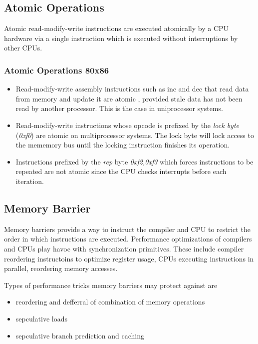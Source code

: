 \documentclass{article}
\begin{document}
\subsection{Atomic Operations}

Atomic read-modify-write instructions are executed atomically by a CPU
hardware via a single instruction which is executed without
interruptions by other CPUs.

\subsubsection{Atomic Operations 80x86}

\begin{itemize}
  \item Read-modify-write assembly instructions such as inc and dec
    that read data from memory and update it are atomic , provided
    stale data has not been read by another processor. This is the
    case in uniprocessor systems.

  \item Read-modify-write instructions whose opcode is prefixed by the
    \emph{lock byte} (\emph{0xf0}) are atomic on multiprocessor
    systems.  The lock byte will lock access to the mememory bus until
    the locking instruction finishes its operation.
  \item Instructions prefixed by the \emph{rep} byte \emph{0xf2,0xf3}
    which forces instructions to be repeated are not atomic since the
    CPU checks interrupts before each iteration.

\end{itemize}


\subsection{Memory Barrier}


Memory barriers provide a way to instruct the compiler and CPU to
restrict the order in which instructions are executed. Performance
optimizations of compilers and CPUs play havoc with synchronization
primitives. These include compiler reordering instructoins to optimize
register usage, CPUs executing instructions in parallel, reordering
memory accesses.


Types of performance tricks memory barriers may protect against are
\begin{itemize}
\item reordering and defferral of combination of memory operations
\item sepculative loads
\item sepculative branch prediction and caching
\end{itemize}
\end{document}
